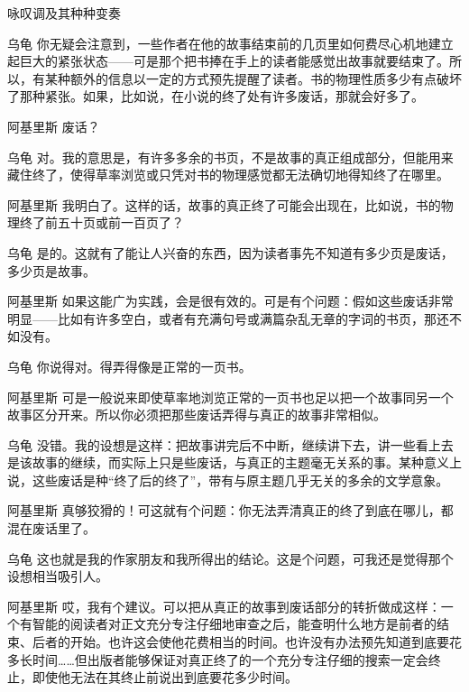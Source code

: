 \begin{dialog}{咏叹调及其种种变奏}
\begin{dialogue}
\item[乌龟]你无疑会注意到，一些作者在他的故事结束前的几页里如何费尽心机地建立起巨大的紧张状态——可是那个把书捧在手上的读者能感觉出故事就要结束了。所以，有某种额外的信息以一定的方式预先提醒了读者。书的物理性质多少有点破坏了那种紧张。如果，比如说，在小说的终了处有许多废话，那就会好多了。

\item[阿基里斯]废话？

\item[乌龟]对。我的意思是，有许多多余的书页，不是故事的真正组成部分，但能用来藏住终了，使得草率浏览或只凭对书的物理感觉都无法确切地得知终了在哪里。

\item[阿基里斯]我明白了。这样的话，故事的真正终了可能会出现在，比如说，书的物理终了前五十页或前一百页了？

\item[乌龟]是的。这就有了能让人兴奋的东西，因为读者事先不知道有多少页是废话，多少页是故事。

\item[阿基里斯]如果这能广为实践，会是很有效的。可是有个问题：假如这些废话非常明显——比如有许多空白，或者有充满句号或满篇杂乱无章的字词的书页，那还不如没有。

\item[乌龟]你说得对。得弄得像是正常的一页书。

\item[阿基里斯]可是一般说来即使草率地浏览正常的一页书也足以把一个故事同另一个故事区分开来。所以你必须把那些废话弄得与真正的故事非常相似。

\item[乌龟]没错。我的设想是这样：把故事讲完后不中断，继续讲下去，讲一些看上去是该故事的继续，而实际上只是些废话，与真正的主题毫无关系的事。某种意义上说，这些废话是种“终了后的终了”，带有与原主题几乎无关的多余的文学意象。

\item[阿基里斯]真够狡猾的！可这就有个问题：你无法弄清真正的终了到底在哪儿，都混在废话里了。

\item[乌龟]这也就是我的作家朋友和我所得出的结论。这是个问题，可我还是觉得那个设想相当吸引人。

\item[阿基里斯]哎，我有个建议。可以把从真正的故事到废话部分的转折做成这样：一个有智能的阅读者对正文充分专注仔细地审查之后，能查明什么地方是前者的结束、后者的开始。也许这会使他花费相当的时间。也许没有办法预先知道到底要花多长时间……但出版者能够保证对真正终了的一个充分专注仔细的搜索一定会终止，即使他无法在其终止前说出到底要花多少时间。


\end{dialogue}
\end{dialog}
